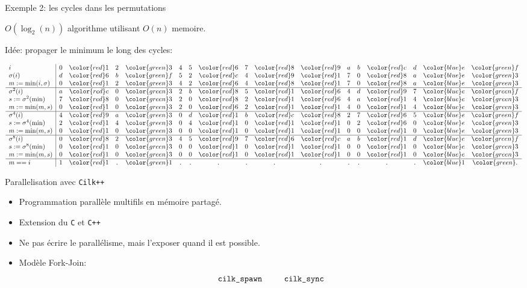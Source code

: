\documentclass{beamer}
\begin{document}
\begin{frame}[fragile]{Exemple 2: les cycles dans les permutations}

  $O(\log_2(n))$ algorithme utilisant $O(n)$ memoire.
  \medskip

  Idée: propager le minimum le long des cycles:
  \medskip

  {\def\s{\sigma}\def\m{\min}%
    \def\r#1{{\color{red}#1}}%
    \def\g#1{{\color{green}#1}}%
    \def\b#1{{\color{blue}#1}}%
  \small
  \[
  \begin{array}{l|*{16}c}
    i           & 0&\r{1}&2&\g{3}&4&5&\r{6}&7&\r{8}&\r{9}&a&b&\r{c}&d&\b{e}&\g{f} \\
    \s(i)       & d&\r{6}&b&\g{f}&5&2&\r{c}&4&\r{9}&\r{1}&7&0&\r{8}&a&\b{e}&\g{3} \\
    m:=\m(i,\s) & 0&\r{1}&2&\g{3}&4&2&\r{6}&4&\r{8}&\r{1}&7&0&\r{8}&a&\b{e}&\g{3} \\
    \hline
    \s^2(i)     & a&\r{c}&0&\g{3}&2&b&\r{8}&5&\r{1}&\r{6}&4&d&\r{9}&7&\b{e}&\g{f} \\
    s:=\s^2(\m) & 7&\r{8}&0&\g{3}&2&0&\r{8}&2&\r{1}&\r{6}&4&a&\r{1}&4&\b{e}&\g{3} \\
    m:=\m(m,s)  & 0&\r{1}&0&\g{3}&2&0&\r{6}&2&\r{1}&\r{1}&4&0&\r{1}&4&\b{e}&\g{3} \\
    \hline
    \s^4(i)     & 4&\r{9}&a&\g{3}&0&d&\r{1}&b&\r{c}&\r{8}&2&7&\r{6}&5&\b{e}&\g{f} \\
    s:=\s^4(\m) & 2&\r{1}&4&\g{3}&0&4&\r{1}&0&\r{1}&\r{1}&0&2&\r{6}&0&\b{e}&\g{3} \\
    m:=\m(m,s)  & 0&\r{1}&0&\g{3}&0&0&\r{1}&0&\r{1}&\r{1}&0&0&\r{1}&0&\b{e}&\g{3} \\
    \hline
    \s^8(i)     & 0&\r{8}&2&\g{3}&4&5&\r{9}&7&\r{6}&\r{c}&a&b&\r{1}&d&\b{e}&\g{f} \\
    s:=\s^8(\m) & 0&\r{1}&0&\g{3}&0&0&\r{1}&0&\r{1}&\r{1}&0&0&\r{1}&0&\b{e}&\g{3} \\
    m:=\m(m,s)  & 0&\r{1}&0&\g{3}&0&0&\r{1}&0&\r{1}&\r{1}&0&0&\r{1}&0&\b{e}&\g{3} \\
    \hline
    m == i      & 1&\r{1}&.&\g{1}&.&.&.&.&.&.&.&.&.&.&\b{1}&\g{.} \\
  \end{array}
  \]}
\end{frame}

\begin{frame}{Parallelisation avec \texttt{Cilk++}}
  

  \begin{NOTE}
    \begin{itemize}
    \item Programmation parallèle multifils en mémoire partagé.
      \bigskip\pause
    \item Extension du \texttt{C} et \texttt{C++}
      \bigskip\pause
    \item Ne pas écrire le parallélisme, mais l'exposer quand il est
      possible.
      \bigskip\pause
    \item Modèle Fork-Join:
\[\texttt{cilk\_spawn \qquad cilk\_sync}\]
    \end{itemize}
  \end{NOTE}
\end{frame}
\end{document}
